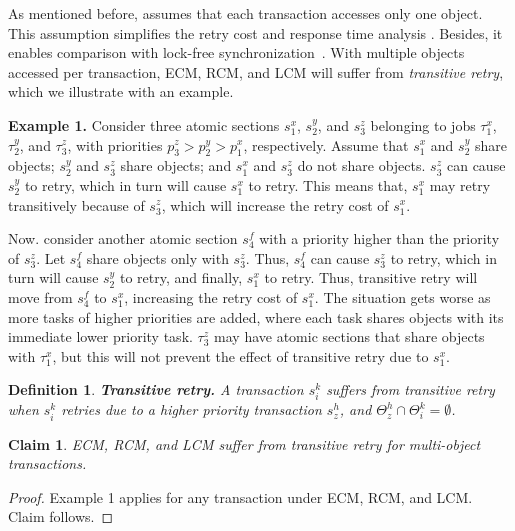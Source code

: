 \documentclass[twocolumn]{article}
\newtheorem{clm}{Claim}
\newtheorem{mydef}{Definition}
\newtheorem{proof}{Proof}
\begin{document}

As mentioned before, \cite{stmconcurrencycontrol:emsoft11,lcmdac2012} assumes that each transaction accesses only one object. This assumption simplifies the retry cost 
and response time analysis 
\cite{stmconcurrencycontrol:emsoft11,lcmdac2012}. Besides, it enables comparison with lock-free synchronization~\cite{key-5}. With multiple objects accessed per transaction, ECM, RCM, and LCM will suffer from \emph{transitive   retry}, which we illustrate with an example.


\textbf{Example 1.} Consider three atomic sections $s_{1}^{x}$, $s_{2}^{y}$, 
and $s_{3}^{z}$ belonging to jobs $\tau_{1}^{x}$, $\tau_{2}^{y}$, 
and $\tau_{3}^{z}$, with priorities $p_{3}^{z}>p_{2}^{y}>p_{1}^{x}$, respectively. 
Assume that $s_{1}^{x}$ and $s_{2}^{y}$ share objects; $s_{2}^{y}$ and $s_{3}^{z}$
share objects; and $s_{1}^{x}$ and $s_{3}^{z}$ do not share objects.
$s_{3}^{z}$ can cause $s_{2}^{y}$ to retry, which in turn will cause $s_{1}^{x}$ to retry. 
This means that, $s_{1}^{x}$ may retry transitively
because of $s_{3}^{z}$, which will increase the retry cost of $s_{1}^{x}$.

Now. consider another atomic section $s_4^f$ with a priority higher than the priority of $s_3^z$. Let $s_4^f$ share  objects only with $s_3^z$. Thus, $s_4^f$ can cause $s_3^z$ to retry, which in turn will cause $s_2^y$ to retry, and finally, $s_1^x$ to retry. Thus, transitive retry will move from $s_{4}^{f}$ to $s_{1}^{x}$, increasing the retry cost of $s_{1}^{x}$. 
The situation gets worse as more tasks of higher priorities are added, where each task
shares objects with its immediate lower priority task. $\tau_{3}^{z}$
may have atomic sections that share objects with $\tau_{1}^{x}$,
but this will not prevent the effect of transitive retry due to $s_{1}^{x}$.

\begin{mydef}
\label{defn:trans-retry}
\textbf{Transitive retry.} A transaction $s_{i}^{k}$ suffers from
transitive retry when $s_i^k$ retries due to a higher priority transaction $s_z^h$, and $\Theta_z^h \cap \Theta_i^k=\emptyset$.
\end{mydef}
%
\begin{clm}\label{ecm-rcm-transitive-retry}
ECM, RCM, and LCM suffer from transitive retry for multi-object transactions.
\end{clm}
\begin{proof}\normalfont
Example 1 applies for any transaction under ECM, RCM, and LCM. Claim follows.
\end{proof}
\end{document}
